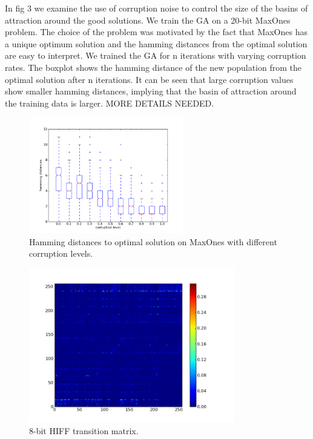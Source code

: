 \documentclass[runningheads,a4paper]{llncs}
\begin{document}
In fig 3 we examine the use of corruption noise to control the size of the basins of attraction around the good solutions. We train the GA on a 20-bit MaxOnes problem. The choice of the problem was motivated by the fact that MaxOnes has a unique optimum solution and the hamming distances from the optimal solution are easy to interpret. We trained the GA for n iterations with varying corruption rates. The boxplot shows the hamming distance of the new population from the optimal solution after n iterations. It can be seen that large corruption values show smaller hamming distances, implying that the basin of attraction around the training data is larger. MORE DETAILS NEEDED.

\begin{figure}[t!]
\center
\includegraphics[width = 0.6\textwidth]{images/boxplots_basins.png}

\caption{Hamming distances to optimal solution on MaxOnes with different corruption levels.} 
\label{figure:8bithiff}
\end{figure}

\begin{figure}[t!]
\center
\includegraphics[width = 0.8\textwidth]{images/hiff-8-transition.png}

\caption{8-bit HIFF transition matrix.} 
\label{figure:8bithiff}
\end{figure}
\end{document}
